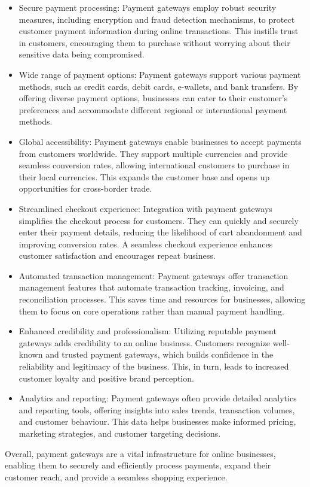 \begin{enumerate}
\begin{itemize}
    \item Secure payment processing: Payment gateways employ robust security measures, including encryption and fraud detection mechanisms, to protect customer payment information during online transactions. This instills trust in customers, encouraging them to purchase without worrying about their sensitive data being compromised.

    \item Wide range of payment options: Payment gateways support various payment methods, such as credit cards, debit cards, e-wallets, and bank transfers. By offering diverse payment options, businesses can cater to their customer's preferences and accommodate different regional or international payment methods.

    \item Global accessibility: Payment gateways enable businesses to accept payments from customers worldwide. They support multiple currencies and provide seamless conversion rates, allowing international customers to purchase in their local currencies. This expands the customer base and opens up opportunities for cross-border trade.

    \item Streamlined checkout experience: Integration with payment gateways simplifies the checkout process for customers. They can quickly and securely enter their payment details, reducing the likelihood of cart abandonment and improving conversion rates. A seamless checkout experience enhances customer satisfaction and encourages repeat business.

    \item Automated transaction management: Payment gateways offer transaction management features that automate transaction tracking, invoicing, and reconciliation processes. This saves time and resources for businesses, allowing them to focus on core operations rather than manual payment handling.

    \item Enhanced credibility and professionalism: Utilizing reputable payment gateways adds credibility to an online business. Customers recognize well-known and trusted payment gateways, which builds confidence in the reliability and legitimacy of the business. This, in turn, leads to increased customer loyalty and positive brand perception.

    \item Analytics and reporting: Payment gateways often provide detailed analytics and reporting tools, offering insights into sales trends, transaction volumes, and customer behaviour. This data helps businesses make informed pricing, marketing strategies, and customer targeting decisions.
\end{itemize}
Overall, payment gateways are a vital infrastructure for online businesses, enabling them to securely and efficiently process payments, expand their customer reach, and provide a seamless shopping experience.


\end{enumerate}
